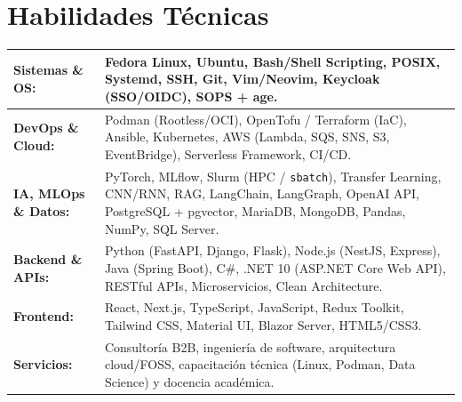 \section{Habilidades Técnicas}
\begin{tabular}{@{}p{3.5cm}>{\raggedright\arraybackslash}p{12.5cm}@{}}
  \textbf{Sistemas \& OS:}   & Fedora Linux, Ubuntu, Bash/Shell Scripting, POSIX, Systemd, SSH, Git, Vim/Neovim, Keycloak (SSO/OIDC), SOPS + age. \\
  \midrule
  \textbf{DevOps \& Cloud:} & Podman (Rootless/OCI), OpenTofu / Terraform (IaC), Ansible, Kubernetes, AWS (Lambda, SQS, SNS, S3, EventBridge), Serverless Framework, CI/CD. \\
  \midrule
  \textbf{IA, MLOps \& Datos:} & PyTorch, MLflow, Slurm (HPC / \texttt{sbatch}), Transfer Learning, CNN/RNN, RAG, LangChain, LangGraph, OpenAI API, PostgreSQL + pgvector, MariaDB, MongoDB, Pandas, NumPy, SQL Server. \\
  \midrule
  \textbf{Backend \& APIs:} & Python (FastAPI, Django, Flask), Node.js (NestJS, Express), Java (Spring Boot), C\#, .NET 10 (ASP.NET Core Web API), RESTful APIs, Microservicios, Clean Architecture. \\
  \midrule
  \textbf{Frontend:}         & React, Next.js, TypeScript, JavaScript, Redux Toolkit, Tailwind CSS, Material UI, Blazor Server, HTML5/CSS3. \\
  \midrule
  \textbf{Servicios:}        & Consultoría B2B, ingeniería de software, arquitectura cloud/FOSS, capacitación técnica (Linux, Podman, Data Science) y docencia académica. \\
\end{tabular}

